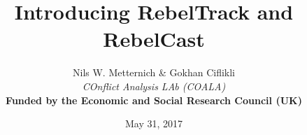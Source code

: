\documentclass{beamer}
\begin{document}
\title[UCL]
{
Introducing RebelTrack and RebelCast}
\author[APSA 2017]
{
Nils W. Metternich \& Gokhan Ciflikli \\[3ex]
\footnotesize{\emph{COnflict Analysis LAb (COALA)}}\\
\textbf{Funded by the Economic and Social Research Council (UK)}}

\date{May 31, 2017}

\begin{frame}
\titlepage
\end{frame}
\end{document}

